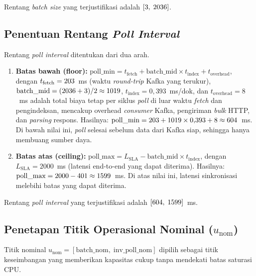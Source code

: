 Rentang \emph{batch size} yang terjustifikasi adalah $[3,\; 2036]$.

\subsection{Penentuan Rentang \emph{Poll Interval}}
\label{sec:poll-range}

Rentang \emph{poll interval} ditentukan dari dua arah.

\begin{enumerate}
\item \textbf{Batas bawah (floor):}
$\text{poll\_min} = t_{\text{fetch}} + \text{batch\_mid} \times t_{\text{index}} + t_{\text{overhead}}$,
dengan $t_{\text{fetch}} = \text{203}$~ms (waktu \emph{round-trip} Kafka yang terukur),
$\text{batch\_mid} = (2036 + 3)/2 \approx 1019$, $t_{\text{index}} = 0{,}393$~ms/dok,
dan $t_{\text{overhead}} = 8$~ms adalah total biaya tetap per siklus \emph{poll} di luar waktu
\emph{fetch} dan pengindeksan, mencakup overhead \emph{consumer} Kafka, pengiriman \emph{bulk} HTTP,
dan \emph{parsing} respons.
Hasilnya: $\text{poll\_min} = 203 + 1019 \times 0{,}393 + 8 \approx 604$~ms.
Di bawah nilai ini, \emph{poll} selesai sebelum data dari Kafka siap, sehingga hanya membuang sumber daya.

\item \textbf{Batas atas (ceiling):}
$\text{poll\_max} = L_{\text{SLA}} - \text{batch\_mid} \times t_{\text{index}}$,
dengan $L_{\text{SLA}} = 2000$~ms (latensi end-to-end yang dapat diterima).
Hasilnya: $\text{poll\_max} = 2000 - 401 \approx 1599$~ms.
Di atas nilai ini, latensi sinkronisasi melebihi batas yang dapat diterima.
\end{enumerate}

Rentang \emph{poll interval} yang terjustifikasi adalah $[604,\; 1599]$~ms.

\subsection{Penetapan Titik Operasional Nominal ($u_{\text{nom}}$)}

Titik nominal $u_{\text{nom}} = [\text{batch\_nom},\; \text{inv\_poll\_nom}]$ dipilih sebagai
titik keseimbangan yang memberikan kapasitas cukup tanpa mendekati batas saturasi CPU.

